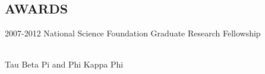 \documentclass[line,margin]{res}
\newcommand{\CVOnly}[1]{}
\newcommand{\CVOnly}[1]{#1}
\begin{document}
\begin{resume}
{\section{AWARDS}
\vspace{1.0pc}	
          2007-2012 National Science Foundation Graduate Research Fellowship 
\CVOnly{\\[0.0pc]2007 Stanford Graduate Fellowship }
\CVOnly{\\[0.0pc]2007 John McCamey Award presented by ISA}
\\[0.0pc] Tau Beta Pi and Phi Kappa Phi
}
%
\CVOnly{
\section{REFERENCES}
\vspace{1.0pc}
Kenneth Salisbury, Prof. Computer Science, 650.465.5700, jks@robotics.stanford.edu
\\[0.0pc]Paul Mitiguy, Prof. Mechanical Engineering, 650.346.9595,  mitiguy@stanford.edu
\\[0.0pc]Kaijen Hsiao, Research Scientist, Willow Garage, Inc., 617.304.1759,  hsiao@willowgarage.com
}
% 
\end{resume}
\end{document}
